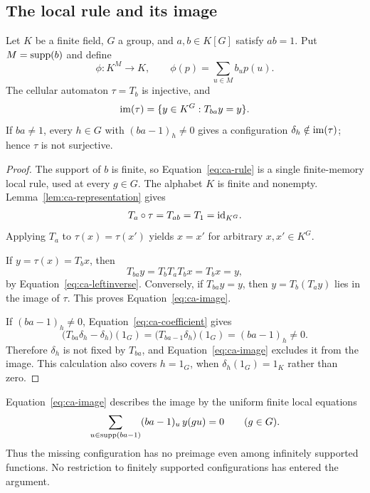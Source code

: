 \subsection{The local rule and its image}

\begin{proposition}
\label{prop:ca-transfer}
Let $K$ be a finite field, $G$ a group, and $a,b\in K[G]$ satisfy
$ab=1$. Put $M=\operatorname{supp}(b)$ and define
\begin{equation}
\label{eq:ca-rule}
  \phi:K^M\longrightarrow K,
  \qquad \phi(p)=\sum_{u\in M}b_up(u).
\end{equation}
The cellular automaton $\tau=T_b$ is injective, and
\begin{equation}
\label{eq:ca-image}
  \operatorname{im}(\tau)=\{y\in K^G:T_{ba}y=y\}.
\end{equation}
If $ba\ne1$, every $h\in G$ with $(ba-1)_h\ne0$ gives a
configuration $\delta_h\notin\operatorname{im}(\tau)$; hence $\tau$ is not
surjective.
\end{proposition}

\begin{proof}
The support of $b$ is finite, so Equation~\eqref{eq:ca-rule} is a
single finite-memory local rule, used at every $g\in G$. The alphabet
$K$ is finite and nonempty. Lemma~\ref{lem:ca-representation} gives
\begin{equation}
\label{eq:ca-leftinverse}
  T_a\circ\tau=T_{ab}=T_1=\mathrm{id}_{K^G}.
\end{equation}
Applying $T_a$ to $\tau(x)=\tau(x')$ yields $x=x'$ for arbitrary
$x,x'\in K^G$.

If $y=\tau(x)=T_bx$, then
\[
  T_{ba}y=T_bT_aT_bx=T_bx=y,
\]
by Equation~\eqref{eq:ca-leftinverse}. Conversely, if $T_{ba}y=y$,
then $y=T_b(T_ay)$ lies in the image of $\tau$. This proves
Equation~\eqref{eq:ca-image}.

If $(ba-1)_h\ne0$, Equation~\eqref{eq:ca-coefficient} gives
\[
  \bigl(T_{ba}\delta_h-\delta_h\bigr)(1_G)
  =\bigl(T_{ba-1}\delta_h\bigr)(1_G)
  =(ba-1)_h\ne0.
\]
Therefore $\delta_h$ is not fixed by $T_{ba}$, and
Equation~\eqref{eq:ca-image} excludes it from the image. This
calculation also covers $h=1_G$, when $\delta_h(1_G)=1_K$ rather
than zero.
\end{proof}

Equation~\eqref{eq:ca-image} describes the image by the uniform
finite local equations
\[
  \sum_{u\in\operatorname{supp}(ba-1)}(ba-1)_u\,y(gu)=0
  \qquad(g\in G).
\]
Thus the missing configuration has no preimage even among infinitely
supported functions. No restriction to finitely supported
configurations has entered the argument.


